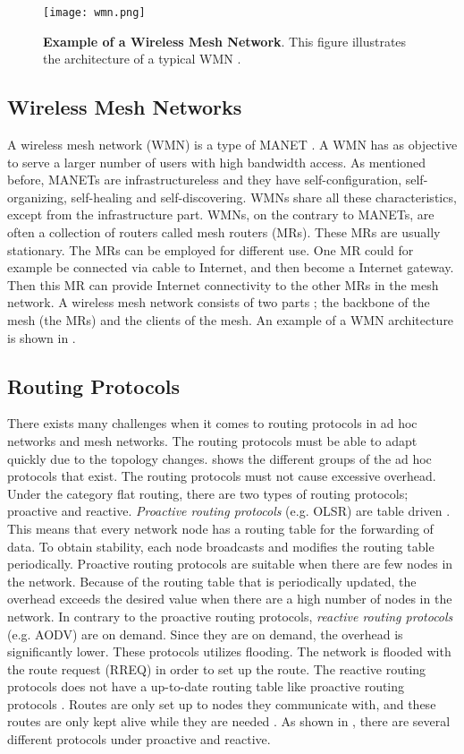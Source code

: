 \begin{figure}[b]
  \centering
    \texttt{[image: wmn.png]}
     \caption [Example of a Wireless Mesh Network]{\textbf{Example of a Wireless Mesh Network}. This figure illustrates the architecture of a typical WMN \cite{wmn}.}
\label{fig:wmn}
\end{figure}

\subsection{Wireless Mesh Networks}
A wireless mesh network (WMN) is a type of MANET \cite{wmn}. A WMN has as objective to serve a larger number of users with high bandwidth access. As mentioned before, MANETs are infrastructureless and they have self-configuration, self-organizing, self-healing and self-discovering. WMNs share all these characteristics, except from the infrastructure part. WMNs, on the contrary to MANETs, are often a collection of routers called mesh routers (MRs). These MRs are usually stationary. The MRs can be employed for different use. One MR could for example be connected via cable to Internet, and then become a Internet gateway. Then this MR can provide Internet connectivity to the other MRs in the mesh network. A wireless mesh network consists of two parts \cite{wmn}; the backbone of the mesh (the MRs) and the clients of the mesh. An example of a WMN architecture is shown in . 


\subsection{Routing Protocols}
There exists many challenges when it comes to routing protocols in ad hoc networks and mesh networks. The routing protocols must be able to adapt quickly due to the topology changes.  shows the different groups of the ad hoc protocols that exist. The routing protocols must not cause excessive overhead. Under the category flat routing, there are two types of routing protocols; proactive and reactive. \textit{Proactive routing protocols} (e.g. OLSR) are table driven \citep{proactivereactive}. This means that every network node has a routing table for the forwarding of data. To obtain stability, each node broadcasts and modifies the routing table periodically. Proactive routing protocols are suitable when there are few nodes in the network. Because of the routing table that is periodically updated, the overhead exceeds the desired value when there are a high number of nodes in the network. In contrary to the proactive routing protocols, \textit{reactive routing protocols} (e.g. AODV) are on demand. Since they are on demand, the overhead is significantly lower. These protocols utilizes flooding. The network is flooded with the route request (RREQ) in order to set up the route. The reactive routing protocols does not have a up-to-date routing table like proactive routing protocols \cite{proactivereactive}. Routes are only set up to nodes they communicate with, and these routes are only kept alive while they are needed  \cite{adhoc2}. As shown in , there are several different protocols under proactive and reactive. 


